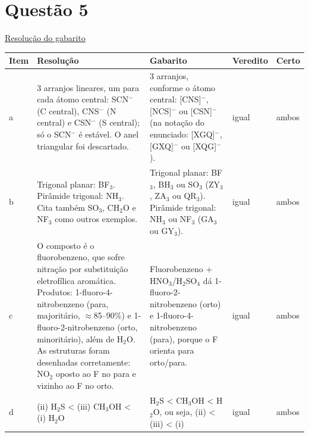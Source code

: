 \documentclass{article}%
\begin{document}
\section*{Questão 5}%
\href{https://poliedroresolve.sistemapoliedro.com.br/vestibulares/ita/2026/ita-2-fase-dia-2-29-10-2025-2-fase-dia-2/dissertativa-5-quimica-2-fase-dia-2-ita-2026}{Resolução do gabarito}\par\smallskip%
\begin{longtable}{@{}p{} p{} p{} p{} p{}@{}}\toprule Item & Resolução & Gabarito & Veredito & Certo \\ \midrule
a & 3 arranjos lineares, um para cada átomo central: SCN$^{-}$ (C central), CNS$^{-}$ (N central) e CSN$^{-}$ (S central); só o SCN$^{-}$ é estável. O anel triangular foi descartado. & 3 arranjos, conforme o átomo central: {[}CNS{]}$^{-}$, {[}NCS{]}$^{-}$ ou {[}CSN{]}$^{-}$ (na notação do enunciado: {[}XGQ{]}$^{-}$, {[}GXQ{]}$^{-}$ ou {[}XQG{]}$^{-}$). & igual & ambos \\
b & Trigonal planar: BF$_{3}$. Pirâmide trigonal: NH$_{3}$. Cita também SO$_{3}$, CH$_{2}$O e NF$_{3}$ como outros exemplos. & Trigonal planar: BF$_{3}$, BH$_{3}$ ou SO$_{3}$ (ZY$_{3}$, ZA$_{3}$ ou QR$_{3}$). Pirâmide trigonal: NH$_{3}$ ou NF$_{3}$ (GA$_{3}$ ou GY$_{3}$). & igual & ambos \\
c & O composto é o fluorobenzeno, que sofre nitração por substituição eletrofílica aromática. Produtos: 1{-}fluoro{-}4{-}nitrobenzeno (para, majoritário, $\approx$85--90\%) e 1{-}fluoro{-}2{-}nitrobenzeno (orto, minoritário), além de H$_{2}$O. As estruturas foram desenhadas corretamente: NO$_{2}$ oposto ao F no para e vizinho ao F no orto. & Fluorobenzeno + HNO$_{3}$/H$_{2}$SO$_{4}$ dá 1{-}fluoro{-}2{-}nitrobenzeno (orto) e 1{-}fluoro{-}4{-}nitrobenzeno (para), porque o F orienta para orto/para. & igual & ambos \\
d & (ii) H$_{2}$S < (iii) CH$_{3}$OH < (i) H$_{2}$O & H$_{2}$S < CH$_{3}$OH < H$_{2}$O, ou seja, (ii) < (iii) < (i) & igual & ambos \\
\bottomrule\end{longtable}%
\end{document}
